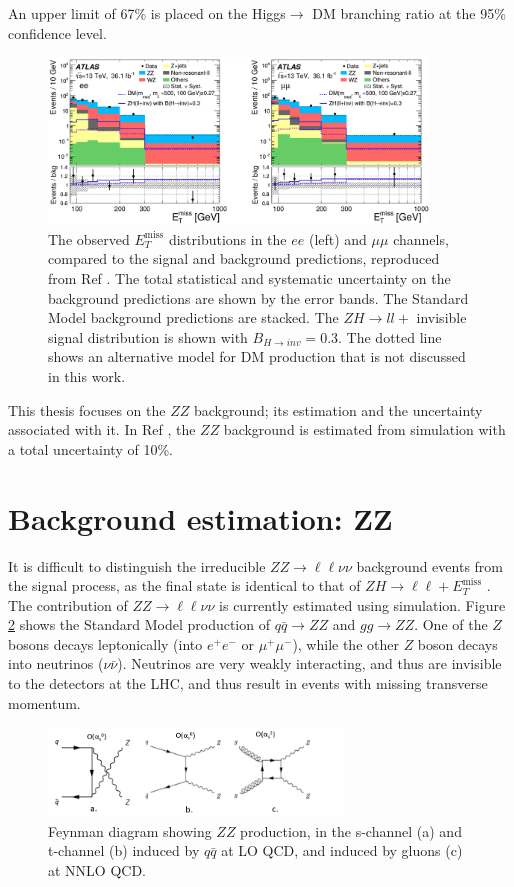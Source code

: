 \documentclass[12pt,a4paper,openright,twoside]{report}
\newcommand{\ZZ}{$ZZ\to \ell\ell\nu\nu$ }
\newcommand{\met}{$E_T^{\mathrm{miss}}$ }
\begin{document}
An upper limit of 67\% is placed on the Higgs$\to$ DM branching ratio at the 95\% confidence level.
\begin{figure}[h]
\centering
		\includegraphics[width=0.9\textwidth]{ZH_results.png}
		\caption{The observed \met distributions in the $ee$ (left) and $\mu\mu$ channels, compared to the signal and background predictions, reproduced from Ref \cite{ZH_ATLAS}. The total statistical and systematic uncertainty on the background predictions are shown by the error bands. The Standard Model background predictions are stacked. The $ZH\to ll+$ invisible signal distribution is shown with $B_{H\to inv}=0.3$. The dotted line shows an alternative model for DM production that is not discussed in this work.}
		\label{fig:ZH_results}
\end{figure}

This thesis focuses on the $ZZ$ background; its estimation and the uncertainty associated with it. In Ref \cite{ZH_ATLAS}, the $ZZ$ background is estimated from simulation with a total uncertainty of 10\%.



\section{Background estimation: ZZ}
It is difficult to distinguish the irreducible \ZZ background events from the signal process, as the final state is identical to that of $ZH\to \ell\ell+$\met. The contribution of \ZZ is currently estimated using simulation. Figure \ref{fig:ZZ} shows the Standard Model production of $q\bar{q}\to ZZ$ and $gg\to ZZ$. One of the $Z$ bosons decays leptonically (into $e^+e^-$ or $\mu^+\mu^-$), while the other $Z$ boson decays into neutrinos ($\nu\bar{\nu}$). Neutrinos are very weakly interacting, and thus are invisible to the detectors at the LHC, and thus result in events with missing transverse momentum.

\begin{figure}[H]
\centering
		\includegraphics[width=0.7\textwidth]{ZZ.png}
		\caption{Feynman diagram showing $ZZ$ production, in the s-channel (a) and t-channel (b) induced by $q\bar{q}$ at LO QCD, and induced by gluons (c) at NNLO QCD.}
		\label{fig:ZZ}
\end{figure}
\end{document}
